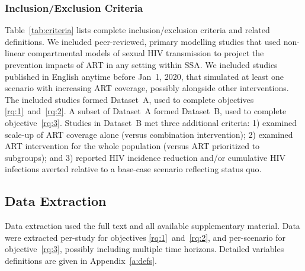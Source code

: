 \subsubsection{Inclusion/Exclusion Criteria}
\label{sss:meth:criteria}
Table~\ref{tab:criteria} lists complete inclusion/exclusion criteria and related definitions.
We included peer-reviewed, primary modelling studies that used
non-linear compartmental models of sexual HIV transmission
to project the prevention impacts of ART in any setting within SSA.
We included studies published in English anytime before Jan~1, 2020,
that simulated at least one scenario with increasing ART coverage,
possibly alongside other interventions.
The included studies formed Dataset~A, used to complete objectives \ref{rq:1}~and~\ref{rq:2}.
A subset of Dataset~A formed Dataset~B, used to complete objective~\ref{rq:3}.
Studies in Dataset~B met three additional criteria:
1) examined scale-up of ART coverage alone (versus combination intervention);
2) examined ART intervention for the whole population (versus ART prioritized to subgroups); and
3) reported HIV incidence reduction and/or cumulative HIV infections averted
relative to a base-case scenario reflecting status quo.
\subsection{Data Extraction}
\label{ss:meth:data}
Data extraction used the full text and all available supplementary material.
Data were extracted per-study for objectives \ref{rq:1}~and~\ref{rq:2}, and
per-scenario for objective~\ref{rq:3}, possibly including multiple time horizons.
Detailed variables definitions are given in Appendix~\ref{a:defs}.

